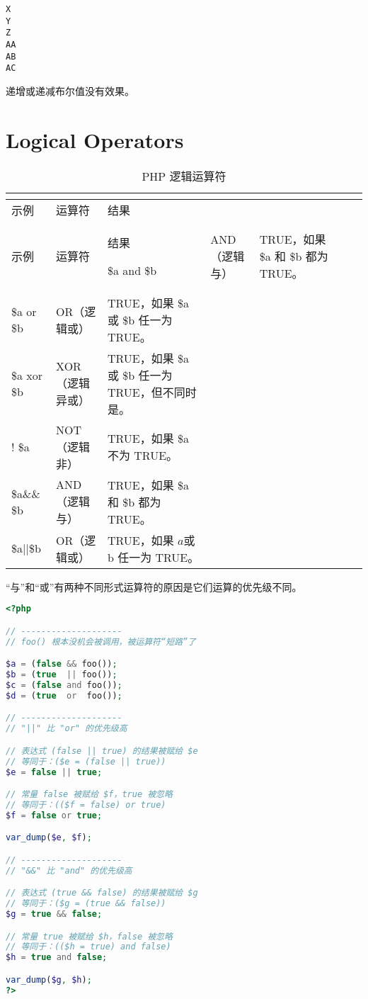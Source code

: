 \begin{verbatim}
X
Y
Z
AA
AB
AC
\end{verbatim}

递增或递减布尔值没有效果。




\section{Logical Operators}



\begin{longtable}{|l|l|l|}
\tabularnewline\hline
示例&运算符		&结果
\endhead

\caption{PHP 逻辑运算符}\\
\hline
示例&运算符		&结果
\endfirsthead

\endfoot

\endlastfoot
\hline
\$a and \$b&AND（逻辑与）&TRUE，如果 \$a 和 \$b 都为 TRUE。\\
\hline
\$a or \$b 	&OR（逻辑或）&TRUE，如果 \$a 或 \$b 任一为 TRUE。\\
\hline
\$a xor \$b&XOR（逻辑异或）&TRUE，如果 \$a 或 \$b 任一为 TRUE，但不同时是。\\
\hline
! \$a &NOT（逻辑非）&TRUE，如果 \$a 不为 TRUE。\\
\hline
\$a\&\&	\$b&AND（逻辑与）&TRUE，如果 \$a 和 \$b 都为 TRUE。\\
\hline
\$a||\$b&OR（逻辑或）		& TRUE，如果 $a 或 $b 任一为 TRUE。\\
\hline
\end{longtable}

“与”和“或”有两种不同形式运算符的原因是它们运算的优先级不同。

\begin{lstlisting}[language=PHP]
<?php

// --------------------
// foo() 根本没机会被调用，被运算符“短路”了

$a = (false && foo());
$b = (true  || foo());
$c = (false and foo());
$d = (true  or  foo());

// --------------------
// "||" 比 "or" 的优先级高

// 表达式 (false || true) 的结果被赋给 $e
// 等同于：($e = (false || true))
$e = false || true;

// 常量 false 被赋给 $f，true 被忽略
// 等同于：(($f = false) or true)
$f = false or true;

var_dump($e, $f);

// --------------------
// "&&" 比 "and" 的优先级高

// 表达式 (true && false) 的结果被赋给 $g
// 等同于：($g = (true && false))
$g = true && false;

// 常量 true 被赋给 $h，false 被忽略
// 等同于：(($h = true) and false)
$h = true and false;

var_dump($g, $h);
?>
\end{lstlisting}

